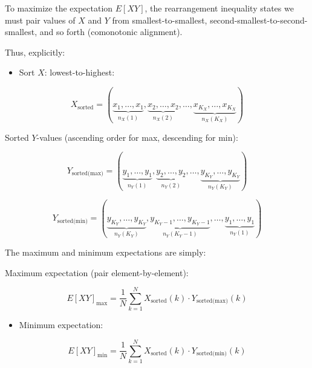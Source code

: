 \documentclass[
  12pt,
]{article}
\providecommand{\tightlist}{%
  \setlength{\itemsep}{0pt}\setlength{\parskip}{0pt}}
\theoremstyle{plain}
\theoremstyle{definition}
\theoremstyle{remark}
\begin{document}
To maximize the expectation \(E[XY]\), the rearrangement inequality
states we must pair values of \(X\) and \(Y\) from smallest-to-smallest,
second-smallest-to-second-smallest, and so forth (comonotonic
alignment).

Thus, explicitly:

\begin{itemize}
\tightlist
\item
  Sort \(X\): lowest-to-highest:
\end{itemize}

\[X_{\text{sorted}} = (\underbrace{x_1,\dots,x_1}_{n_X(1)}, \underbrace{x_2,\dots,x_2}_{n_X(2)}, \dots,\underbrace{x_{K_X},\dots,x_{K_X}}_{n_X(K_X)})\]

Sorted \(Y\)-values (ascending order for max, descending for min):

\[Y_{\text{sorted(max)}} = (\underbrace{y_1,\dots,y_1}_{n_Y(1)}, \underbrace{y_2,\dots,y_2}_{n_Y(2)}, \dots,\underbrace{y_{K_Y},\dots,y_{K_Y}}_{n_Y(K_Y)})\]

\[Y_{\text{sorted(min)}} = (\underbrace{y_{K_Y},\dots,y_{K_Y}}_{n_Y(K_Y)}, \underbrace{y_{K_Y-1},\dots,y_{K_Y-1}}_{n_Y(K_Y-1)}, \dots,\underbrace{y_1,\dots,y_1}_{n_Y(1)})\]

The maximum and minimum expectations are simply:

Maximum expectation (pair element-by-element):

\[E[XY]_{\text{max}} = \frac{1}{N}\sum_{k=1}^{N} X_{\text{sorted}}(k)\cdot Y_{\text{sorted(max)}}(k)\]

\begin{itemize}
\tightlist
\item
  Minimum expectation:
\end{itemize}

\[E[XY]_{\text{min}} = \frac{1}{N}\sum_{k=1}^{N} X_{\text{sorted}}(k)\cdot Y_{\text{sorted(min)}}(k)\]
\end{document}
